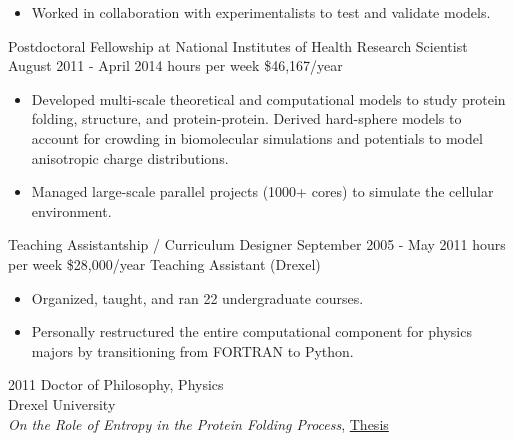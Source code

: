 \documentclass[]{scrartcl}
\begin{document}
\begin{cleanCV}
{\begin{itemize}
  \item Worked in collaboration with experimentalists to test and validate models. 

  \end{itemize}
}


\WorkExperience
{}
{Postdoctoral Fellowship at National Institutes of Health}
{\newline Research Scientist}
{
  \newline August 2011 - April 2014
   hours per week
  \newline \$46,167/year
}
{
  \begin{itemize}
  \item Developed multi-scale theoretical and computational models to study protein folding, structure, and protein-protein. Derived hard-sphere models to account for crowding in biomolecular simulations and potentials to model anisotropic charge distributions.
  \item Managed large-scale parallel projects (1000+ cores) to simulate the cellular environment.
  \end{itemize}
}

\WorkExperience{}
{\newline Teaching Assistantship / Curriculum Designer}
{
  \newline September 2005 - May 2011
   hours per week
  \newline \$28,000/year
}   
{Teaching Assistant (Drexel)}

{
  \begin{itemize}
  \item   Organized, taught, and ran 22 undergraduate courses.
  \item   Personally restructured the entire computational component for physics majors by transitioning from FORTRAN to Python.
  \end{itemize}
}




\WorkExperience
{2011}
{Doctor of Philosophy, Physics}
{
\\Drexel University
\\\emph{On the Role of Entropy in the Protein Folding Process}, \href{https://idea.library.drexel.edu/islandora/object/idea:3488}{Thesis}
}


\end{cleanCV}
\end{document}
